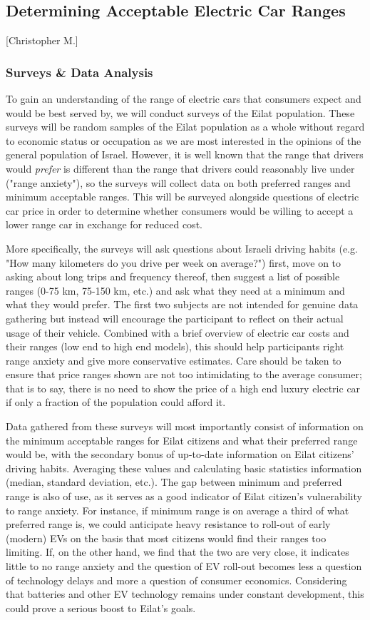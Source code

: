 \documentclass[12pt]{article}                         %
\begin{document}
\subsection{Determining Acceptable Electric Car Ranges}[Christopher M.]
\subsubsection{Surveys \& Data Analysis}
To gain an understanding of the range of electric cars that consumers expect and would be best served by, we will conduct surveys of the Eilat population. These surveys will be random samples of the Eilat population as a whole without regard to economic status or occupation as we are most interested in the opinions of the general population of Israel. However, it is well known that the range that drivers would \textit{prefer} is different than the range that drivers could reasonably live under ("range anxiety"), so the surveys will collect data on both preferred ranges and minimum acceptable ranges. This will be surveyed alongside questions of electric car price in order to determine whether consumers would be willing to accept a lower range car in exchange for reduced cost.

More specifically, the surveys will ask questions about Israeli driving habits (e.g. "How many kilometers do you drive per week on average?") first, move on to asking about long trips and frequency thereof, then suggest a list of possible ranges (0-75 km, 75-150 km, etc.) and ask what they need at a minimum and what they would prefer. The first two subjects are not intended for genuine data gathering but instead will encourage the participant to reflect on their actual usage of their vehicle. Combined with a brief overview of electric car costs and their ranges (low end to high end models), this should help participants right range anxiety and give more conservative estimates. Care should be taken to ensure that price ranges shown are not too intimidating to the average consumer; that is to say, there is no need to show the price of a high end luxury electric car if only a fraction of the population could afford it.

Data gathered from these surveys will most importantly consist of information on the minimum acceptable ranges for Eilat citizens and what their preferred range would be, with the secondary bonus of up-to-date information on Eilat citizens' driving habits. Averaging these values and calculating basic statistics information (median, standard deviation, etc.). The gap between minimum and preferred range is also of use, as it serves as a good indicator of Eilat citizen's vulnerability to range anxiety. For instance, if minimum range is on average a third of what preferred range is, we could anticipate heavy resistance to roll-out of early (modern) EVs on the basis that most citizens would find their ranges too limiting. If, on the other hand, we find that the two are very close, it indicates little to no range anxiety and the question of EV roll-out becomes less a question of technology delays and more a question of consumer economics. Considering that batteries and other EV technology remains under constant development, this could prove a serious boost to Eilat's goals.
\end{document}

